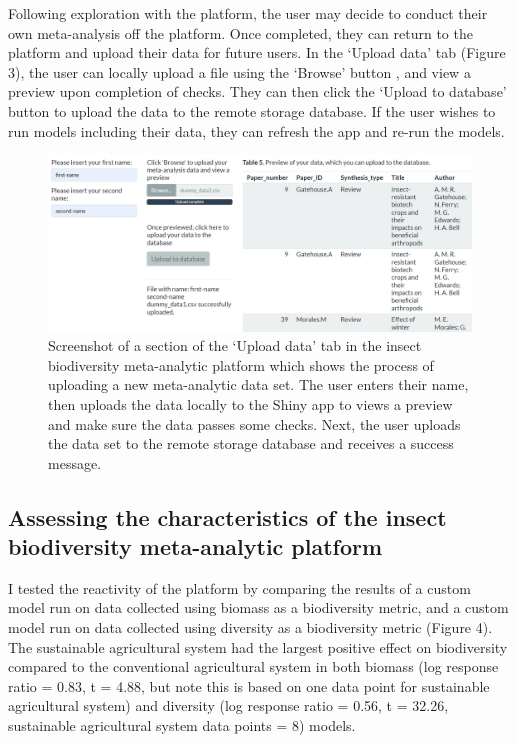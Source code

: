 \documentclass[11pt]{article}
\begin{document}
		\noindent Following exploration with the platform, the user may decide to conduct their own meta-analysis off the platform. Once completed, they can return to the platform and upload their data for future users. In the ‘Upload data’ tab (Figure 3), the user can locally upload a file using the ‘Browse’ button , and view a preview upon completion of checks. They can then click the ‘Upload to database’ button to upload the data to the remote storage database. If the user wishes to run models including their data, they can refresh the app and re-run the models.
		
		\begin{figure}[H] 
			\centering 
			\includegraphics[scale=0.55]{figure_3_upload_data_screenshot.png} 
			\caption{Screenshot of a section of the ‘Upload data’ tab in the insect biodiversity meta-analytic platform which shows the process of uploading a new meta-analytic data set. The user enters their name, then uploads the data locally to the Shiny app to views a preview and make sure the data passes some checks. Next, the user uploads the data set to the remote storage database and receives a success message.}  
		\end{figure}
		
		\subsection{Assessing the characteristics of the insect biodiversity meta-analytic platform}
		I tested the reactivity of the platform by comparing the results of a custom model run on data collected using biomass as a biodiversity metric, and a custom model run on data collected using diversity as a biodiversity metric (Figure 4). The sustainable agricultural system had the largest positive effect on biodiversity compared to the conventional agricultural system in both biomass (log response ratio = 0.83, t = 4.88, but note this is based on one data point for sustainable agricultural system) and diversity (log response ratio = 0.56, t = 32.26, sustainable agricultural system data points = 8) models.
		
\end{document}

